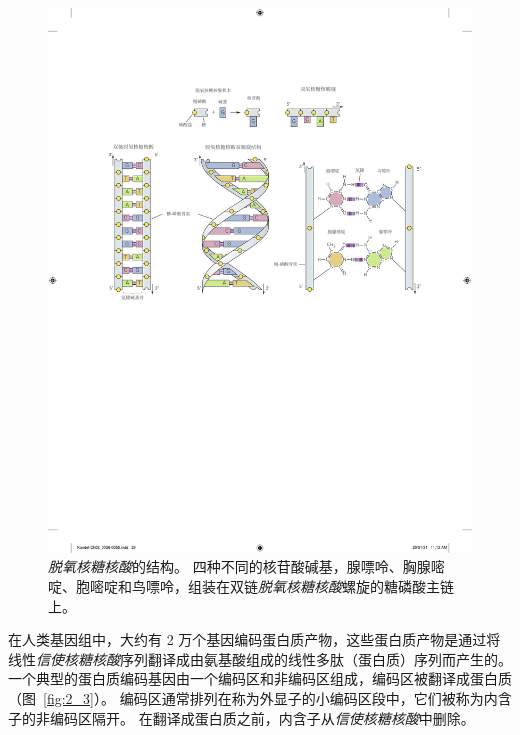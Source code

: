 \begin{figure}[htbp]
	\centering
	\includegraphics[width=1.0\linewidth]{chap02/fig_2_2}
	\caption{\textit{脱氧核糖核酸}的结构。
		四种不同的核苷酸碱基，腺嘌呤、胸腺嘧啶、胞嘧啶和鸟嘌呤，组装在双链\textit{脱氧核糖核酸}螺旋的糖磷酸主链上\cite{alberts2017molecular}。}
	\label{fig:2_2}
\end{figure}


在人类基因组中，大约有 2 万个基因编码蛋白质产物，这些蛋白质产物是通过将线性\textit{信使核糖核酸}序列翻译成由氨基酸组成的线性多肽（蛋白质）序列而产生的。
一个典型的蛋白质编码基因由一个编码区和非编码区组成，编码区被翻译成蛋白质（图~\ref{fig:2_3}）。
编码区通常排列在称为外显子的小编码区段中，它们被称为内含子的非编码区隔开。
在翻译成蛋白质之前，内含子从\textit{信使核糖核酸}中删除。


